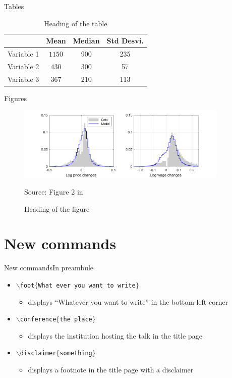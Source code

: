 \documentclass[numbertotal,toc,wide]{../bpslides}
\begin{document}
\begin{frame}{Tables}
	\begin{table}
		\centering
		\caption{Heading of the table}
		\begin{tabular}{cccc} \toprule
		& Mean & Median & Std Desvi.\\ \midrule
		Variable 1 & $1150$ & 900 & 235 \\ 
		Variable 2 & $430$ & 300 & 57 \\ 
		Variable 3 & $367$ & 210 & 113 \\ \bottomrule
		\end{tabular}
	\end{table}
\end{frame}

\begin{frame}{Figures}
	\begin{figure}
		\centering
		\caption{Heading of the figure}
		\includegraphics[width=0.9\textwidth]{figure.pdf}
		\vs\vs\par
		\begin{minipage}{0.75\textwidth}\scriptsize%
		Source: Figure 2 in 
		\end{minipage}
	\end{figure}
\end{frame}

\section{New commands}

\begin{frame}{New commands}{In preambule}
	\begin{itemize}
		\item \texttt{$\backslash$foot$\{$What ever you want to write$\}$} 
		\begin{itemize}
			\item[] displays ``Whatever you want to write'' in the bottom-left corner
		\end{itemize}
		\item \texttt{$\backslash$conference$\{$the place$\}$}
		\begin{itemize}
			\item[] displays the institution hosting the talk in the title page
		\end{itemize}
		\item \texttt{$\backslash$disclaimer$\{$something$\}$} 
		\begin{itemize}
			\item[] displays a footnote in the title page with a disclaimer
		\end{itemize}
	\end{itemize}
\end{frame}
\end{document}
